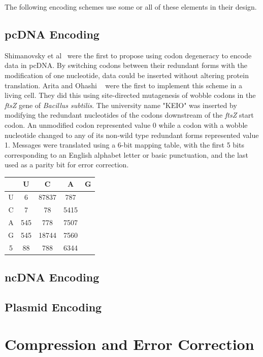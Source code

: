\documentclass[USenglish,oneside,twocolumn]{article}
\begin{document}
The following encoding schemes use some or all of these elements in their design.

\subsection{pcDNA Encoding}

Shimanovsky et al~\cite{SFHC2003BL} were the first to propose using codon degeneracy to encode data in pcDNA. By switching codons between their redundant forms with the modification of one nucleotide, data could be inserted without altering protein translation. Arita and Ohashi ~\cite{AY2004BP} were the first to implement this scheme in a living cell. They did this using site-directed mutagenesis of wobble codons in the \textit{ftsZ} gene of \textit{Bacillus subtilis}. The university name "KEIO" was inserted by modifying the redundant nucleotides of the codons downstream of the \textit{ftsZ} start codon. An unmodified codon represented value 0 while a codon with a wobble nucleotide changed to any of its non-wild type redundant forms represented value 1. Messages were translated using a 6-bit mapping table, with the first 5 bits corresponding to an English alphabet letter or basic punctuation, and the last used as a parity bit for error correction.



\begin{center}
 \begin{tabular}{||c || c c c c||}
 \hline
  & U & C & A & G \\ [0.5ex]
 \hline\hline
 U & 6 & 87837 & 787 \\
 \hline
 C & 7 & 78 & 5415 \\
 \hline
 A & 545 & 778 & 7507 \\
 \hline
 G & 545 & 18744 & 7560 \\
 \hline
 5 & 88 & 788 & 6344 \\ [1ex]
 \hline
\end{tabular}
\end{center}

\subsection{ncDNA Encoding}

\subsection{Plasmid Encoding}

\section{Compression and Error Correction}
\end{document}
